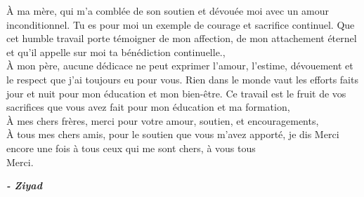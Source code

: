 \dedicace

\begin{fquote}
\begin{center}
\large{

\uppercase{à} ma mère, qui m'a comblée de son soutien et dévouée moi avec un amour inconditionnel. Tu es pour moi un exemple de courage et sacrifice continuel. Que cet humble travail porte témoigner de mon affection, de mon attachement éternel et qu'il appelle sur moi ta bénédiction continuelle.,\\[12pt]
\uppercase{à} mon père, aucune dédicace ne peut exprimer l'amour, l'estime, dévouement et le respect que j'ai toujours eu pour vous. Rien dans le monde vaut les efforts faits jour et nuit pour mon éducation et mon bien-être. Ce travail est le fruit de vos sacrifices que vous avez fait pour mon éducation et ma formation,\\[12pt]
\uppercase{à} mes chers frères, merci pour votre amour, soutien, et encouragements,\\[12pt]
\uppercase{à} tous mes chers amis, pour le soutien que vous m'avez apporté, je dis Merci encore une fois à tous ceux qui me sont chers, à vous tous\\[12pt]
Merci.
}
\end{center}
\bigskip
\medskip
\end{fquote}

\begin{adjustwidth}{2cm}{1cm}
\hspace*{\fill} \textbf{\textit{\large{- Ziyad}}}
\end{adjustwidth}

\clearpage
